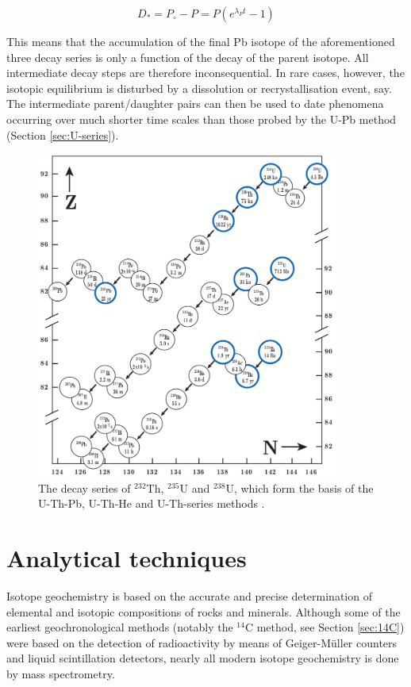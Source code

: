 \documentclass{book}
\newif\ifpdf
\begin{document}
\begin{equation}
D_* = P_\circ - P = P \left( e^{\lambda_P t} -1 \right)
\label{eq:ND*4}
\end{equation}

This means that the accumulation of the final Pb isotope of the
aforementioned three decay series is only a function of the decay of
the parent isotope.  All intermediate decay steps are therefore
inconsequential. In rare cases, however, the isotopic equilibrium is
disturbed by a dissolution or recrystallisation event, say. The
intermediate parent/daughter pairs can then be used to date phenomena
occurring over much shorter time scales than those probed by the U-Pb
method (Section \ref{sec:U-series}).

\begin{figure}[!ht]
  \centering
  \ifpdf
  \texttt{[image: U-Th-series.pdf]}
  \else
  \includegraphics[width=10cm]{U-Th-series.png}
  \fi
  \caption{The decay series of $^{232}$Th, $^{235}$U and $^{238}$U,
    which form the basis of the U-Th-Pb, U-Th-He and U-Th-series methods
    \citep[modified from][]{allegre2008}.}
  \label{fig:U-Th-series}
\end{figure}

\chapter{Analytical techniques}

Isotope geochemistry is based on the accurate and precise
determination of elemental and isotopic compositions of rocks and
minerals.  Although some of the earliest geochronological methods
(notably the $^{14}$C method, see Section \ref{sec:14C}) were based on
the detection of radioactivity by means of Geiger-M\"{u}ller counters
and liquid scintillation detectors, nearly all modern isotope
geochemistry is done by mass spectrometry.
\end{document}
